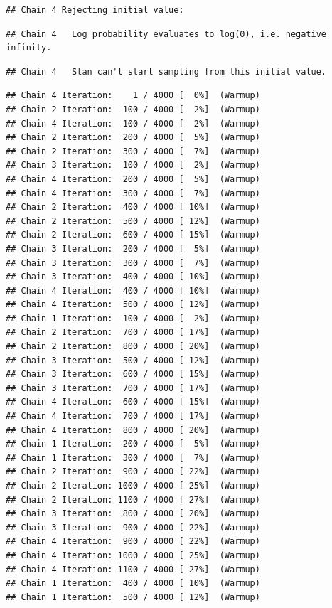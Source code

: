 \documentclass[
]{article}
\begin{document}
\begin{verbatim}
## Chain 4 Rejecting initial value:
\end{verbatim}

\begin{verbatim}
## Chain 4   Log probability evaluates to log(0), i.e. negative infinity.
\end{verbatim}

\begin{verbatim}
## Chain 4   Stan can't start sampling from this initial value.
\end{verbatim}

\begin{verbatim}
## Chain 4 Iteration:    1 / 4000 [  0%]  (Warmup) 
## Chain 2 Iteration:  100 / 4000 [  2%]  (Warmup) 
## Chain 4 Iteration:  100 / 4000 [  2%]  (Warmup) 
## Chain 2 Iteration:  200 / 4000 [  5%]  (Warmup) 
## Chain 2 Iteration:  300 / 4000 [  7%]  (Warmup) 
## Chain 3 Iteration:  100 / 4000 [  2%]  (Warmup) 
## Chain 4 Iteration:  200 / 4000 [  5%]  (Warmup) 
## Chain 4 Iteration:  300 / 4000 [  7%]  (Warmup) 
## Chain 2 Iteration:  400 / 4000 [ 10%]  (Warmup) 
## Chain 2 Iteration:  500 / 4000 [ 12%]  (Warmup) 
## Chain 2 Iteration:  600 / 4000 [ 15%]  (Warmup) 
## Chain 3 Iteration:  200 / 4000 [  5%]  (Warmup) 
## Chain 3 Iteration:  300 / 4000 [  7%]  (Warmup) 
## Chain 3 Iteration:  400 / 4000 [ 10%]  (Warmup) 
## Chain 4 Iteration:  400 / 4000 [ 10%]  (Warmup) 
## Chain 4 Iteration:  500 / 4000 [ 12%]  (Warmup) 
## Chain 1 Iteration:  100 / 4000 [  2%]  (Warmup) 
## Chain 2 Iteration:  700 / 4000 [ 17%]  (Warmup) 
## Chain 2 Iteration:  800 / 4000 [ 20%]  (Warmup) 
## Chain 3 Iteration:  500 / 4000 [ 12%]  (Warmup) 
## Chain 3 Iteration:  600 / 4000 [ 15%]  (Warmup) 
## Chain 3 Iteration:  700 / 4000 [ 17%]  (Warmup) 
## Chain 4 Iteration:  600 / 4000 [ 15%]  (Warmup) 
## Chain 4 Iteration:  700 / 4000 [ 17%]  (Warmup) 
## Chain 4 Iteration:  800 / 4000 [ 20%]  (Warmup) 
## Chain 1 Iteration:  200 / 4000 [  5%]  (Warmup) 
## Chain 1 Iteration:  300 / 4000 [  7%]  (Warmup) 
## Chain 2 Iteration:  900 / 4000 [ 22%]  (Warmup) 
## Chain 2 Iteration: 1000 / 4000 [ 25%]  (Warmup) 
## Chain 2 Iteration: 1100 / 4000 [ 27%]  (Warmup) 
## Chain 3 Iteration:  800 / 4000 [ 20%]  (Warmup) 
## Chain 3 Iteration:  900 / 4000 [ 22%]  (Warmup) 
## Chain 4 Iteration:  900 / 4000 [ 22%]  (Warmup) 
## Chain 4 Iteration: 1000 / 4000 [ 25%]  (Warmup) 
## Chain 4 Iteration: 1100 / 4000 [ 27%]  (Warmup) 
## Chain 1 Iteration:  400 / 4000 [ 10%]  (Warmup) 
## Chain 1 Iteration:  500 / 4000 [ 12%]  (Warmup) 

\end{verbatim}
\end{document}
